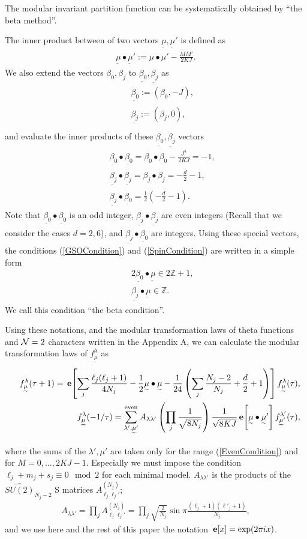 \documentclass[a4paper,12pt]{article}
\numberwithin{equation}{section}
\newcommand{\Ncal}{{\cal N}}
\newcommand{\Zb}{{\mathbb Z}}
\newcommand{\e}[1]{\,{\bf e}\!\left[#1\right]}
\newcommand{\mt}{\underset{\widetilde{}}{\mu}}
\newcommand{\bt}[1]{\underset{\widetilde{}}{\beta_{#1}}}
\newcommand{\nn}{\nonumber}
\begin{document}
The modular invariant partition function can be systematically
obtained by ``the beta method''\cite{Gep88}.

The inner product between of two vectors $\mt,\mt'$ is defined as
\begin{eqnarray*}
 \mt\bullet\mt':=\mu\bullet\mu'-\frac{MM'}{2KJ}.
\end{eqnarray*}
We also extend the vectors $\beta_0,\beta_j$ to $\bt{0},\bt{j}$
as
\begin{eqnarray*}
 && \bt{0}:=(\beta_0,-J),\\
 && \bt{j}:=(\beta_j,0),\\
\end{eqnarray*}
and evaluate the inner products of these $\bt{0},\bt{j}$ vectors
\begin{eqnarray}
 && \bt{0}\bullet\bt{0}=\beta_0\bullet\beta_0-\frac{J^2}{2KJ}=-1,\nn\\
 &&\bt{j}\bullet \bt{j}=\beta_j\bullet\beta_j=-\frac d2-1, \nn\\
 && \bt{j}\bullet \bt{0}=\frac12\left(-\frac d2-1\right). \label{BetaBeta}
\end{eqnarray}
Note that $\bt{0}\bullet\bt{0}$ is an odd integer,
$\bt{j}\bullet \bt{j}$ are even integers (Recall that we consider
the cases $d=2,6$), and $\bt{j}\bullet \bt{0}$ are integers.
Using these special vectors, the conditions 
(\ref{GSOCondition}) and (\ref{SpinCondition})
are written in a simple form
\begin{eqnarray}
 && 2\bt{0}\bullet\mt\in 2\Zb+1,\nn\\
 && \bt{j}\bullet\mt \in \Zb.\label{BetaConditions}
\end{eqnarray}
We call this condition ``the beta condition''.

Using these notations, and the modular transformation laws of
theta functions and $\Ncal=2$ characters written in
the Appendix A, we can calculate the modular transformation
laws of $f_{\mt}^{\lambda}$ as
\begin{eqnarray*}
 &&f_{\mt}^{\lambda}(\tau+1)=\e{\sum_j\frac{\ell_j(\ell_j+1)}{4N_j}-\frac12 \mt\bullet\mt-\frac1{24}\left(\sum_{j}\frac{N_j-2}{N_j}+\frac d2+1\right)}
f_{\mt}^{\lambda}(\tau),\\
 &&f_{\mt}^{\lambda}(-1/\tau)=
\sum_{\lambda',\mt'}^{\rm even}
A_{\lambda\lambda'}\left(\prod_j\frac{1}{\sqrt{8N_j}}\right)
\frac{1}{\sqrt{8KJ}}\e{\mt\bullet\mt'}f_{\mt'}^{\lambda'}(\tau),
\end{eqnarray*}
where  the sums of the $\lambda',\mu'$
are taken only for the range (\ref{EvenCondition}) and for
$M=0,\dots,2KJ-1$.
Especially we must impose the condition $\ell_j+m_j+s_j\equiv0\mod 2$
for each minimal model.
$A_{\lambda\lambda'}$ is the products of the $\widehat{SU(2)}_{N_j-2}$
 S matrices $A^{(N_j)}_{\ell_j\ell_j'}$;
\begin{eqnarray*}
  A_{\lambda\lambda'}
=\prod_j A^{(N_j)}_{\ell_j\ell_j'}
=\prod_j\sqrt{\frac{2}{N_j}}\sin \pi
\frac{(\ell_j+1)(\ell'_j+1)}{N_j},
\end{eqnarray*}
and we use
here and the rest of this paper the notation $\e{x}=\exp(2\pi i x)$.
\end{document}
